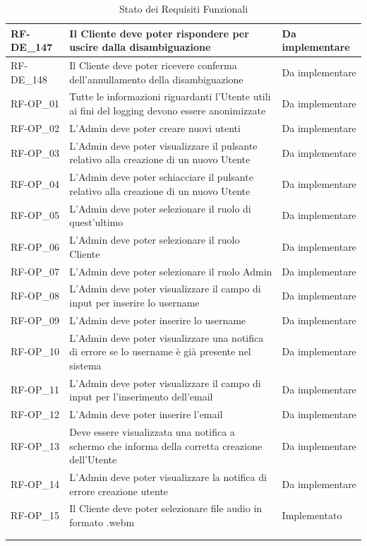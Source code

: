 \begin{longtable}{|>{\raggedright}p{}|>{\raggedright\arraybackslash}p{}|>{\raggedright\arraybackslash}p{}|}
	\hline
	RF-DE\_147 \hypertarget{rf-de_147} & Il Cliente deve poter rispondere \vr{/annulla} per uscire dalla disambiguazione & Da implementare \\
	\hline
	RF-DE\_148 \hypertarget{rf-de_148} & Il Cliente deve poter ricevere conferma dell'annullamento della disambiguazione & Da implementare \\
	\hline
	RF-OP\_01 \hypertarget{rf-op_1} & Tutte le informazioni riguardanti l'Utente utili ai fini del logging devono essere anonimizzate & Da implementare \\
	\hline
	RF-OP\_02 \hypertarget{rf-op_2} & L'Admin deve poter creare nuovi utenti & Da implementare \\
	\hline
	RF-OP\_03 \hypertarget{rf-op_3} & L'Admin deve poter visualizzare il pulsante relativo alla creazione di un nuovo Utente & Da implementare \\
	\hline
	RF-OP\_04 \hypertarget{rf-op_4} & L'Admin deve poter schiacciare il pulsante relativo alla creazione di un nuovo Utente & Da implementare \\
	\hline
	RF-OP\_05 \hypertarget{rf-op_5} & L'Admin deve poter selezionare il ruolo di quest'ultimo & Da implementare \\
	\hline
	RF-OP\_06 \hypertarget{rf-op_6} & L'Admin deve poter selezionare il ruolo Cliente & Da implementare \\
	\hline
	RF-OP\_07 \hypertarget{rf-op_7} & L'Admin deve poter selezionare il ruolo Admin & Da implementare \\
	\hline
	RF-OP\_08 \hypertarget{rf-op_8} & L'Admin deve poter visualizzare il campo di input per inserire lo username & Da implementare \\
	\hline
	RF-OP\_09 \hypertarget{rf-op_9} & L'Admin deve poter inserire lo username & Da implementare \\
	\hline
	RF-OP\_10 \hypertarget{rf-op_10} & L'Admin deve poter visualizzare una notifica di errore se lo username è già presente nel sistema & Da implementare \\
	\hline
	RF-OP\_11 \hypertarget{rf-op_11} & L'Admin deve poter visualizzare il campo di input per l'inserimento dell'email & Da implementare \\
	\hline
	RF-OP\_12 \hypertarget{rf-op_12} & L'Admin deve poter inserire l'email & Da implementare \\
	\hline
	RF-OP\_13 \hypertarget{rf-op_13} & Deve essere visualizzata una notifica a schermo che informa della corretta creazione dell'Utente & Da implementare \\
	\hline
	RF-OP\_14 \hypertarget{rf-op_14} & L'Admin deve poter visualizzare la notifica di errore creazione utente & Da implementare \\
	\hline
	RF-OP\_15 \hypertarget{rf-op_15} & Il Cliente deve poter selezionare file audio in formato .webm & Implementato \\
	\hline
	\multicolumn{3}{c}{} \\
	\caption{Stato dei Requisiti Funzionali}\\
	
\end{longtable}

